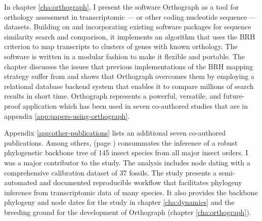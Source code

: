 In chapter \ref{cha:orthograph}, I present the software Orthograph as a
tool for orthology assessment in transcriptomic --- or other coding
nucleotide sequence --- datasets.  Building on and incorporating existing
software packages for sequence similarity search and comparison, it
implements an algorithm that uses the BRH criterion to map transcripts
to clusters of genes with known orthology.  The software is written in a
modular fashion to make it flexible and portable.  The chapter discusses the
issues that previous implementations of the BRH mapping strategy suffer
from and shows that Orthograph overcomes them by employing a relational
database backend system that enables it to compare millions of search
results in short time.  Orthograph represents a powerful, versatile, and
future-proof application which has been used in seven co-authored
studies \citep{Mayer2016, Pauli2016, Bank2017, Dowling2017, Peters2017,
Gillung2018, Johnson2018} that are in appendix
\ref{app:papers-using-orthograph}.

Appendix \ref{app:other-publications} lists an additional seven
co-authored publications.  Among others, \citet{Misof2014} (page
\pageref{app:Misof2014}) consummates the inference of a robust
phylogenetic backbone tree of 145 insect species from all major insect
orders.  I was a major contributor to the study.  The analysis includes
node dating with a comprehensive calibration dataset of 37 fossils.  The
study presents a semi-automated and documented reproducible workflow
that facilitates phylogeny inference from transcriptomic data of many
species.  It also provides the backbone phylogeny and node dates for the
study in chapter \ref{cha:dynamics} and the breeding ground for the
development of Orthograph (chapter \ref{cha:orthograph}).



